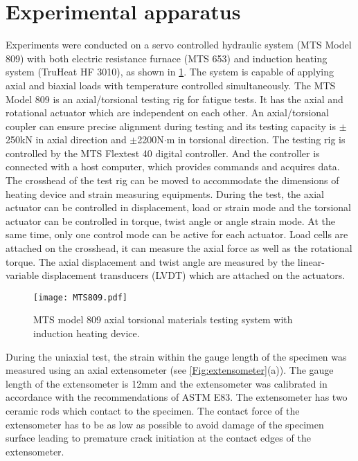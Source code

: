 \section{Experimental apparatus}
\noindent
Experiments were conducted on a servo controlled hydraulic system (MTS Model 809) with both electric resistance furnace (MTS 653) and induction heating system (TruHeat HF 3010), as shown in \ref{Fig:MTS809}.
The system is capable of applying axial and biaxial loads with temperature controlled simultaneously.
The MTS Model 809 is an axial/torsional testing rig for fatigue tests. It has the axial and rotational actuator which are independent on each other.
An axial/torsional coupler can ensure precise alignment during testing and its testing capacity is $\pm$250kN in axial direction and $\pm$2200N$\cdot$m in torsional direction.
The testing rig is controlled by the MTS Flextest 40 digital controller. And the controller is connected with a host computer, which provides commands and acquires data.
The crosshead of the test rig can be moved to accommodate the dimensions of heating device and strain measuring equipments.
During the test, the axial actuator can be controlled in displacement, load or strain mode and the torsional actuator can be controlled in torque, twist angle or angle strain mode.
At the same time, only one control mode can be active for each actuator.
Load cells are attached on the crosshead, it can measure the axial force as well as the rotational torque.
The axial displacement and twist angle are measured by the linear-variable displacement transducers (LVDT) which are attached on the actuators.

\begin{figure}[!htp]
  \centering
  \texttt{[image: MTS809.pdf]}
\caption{MTS model 809 axial torsional materials testing system with induction heating device.}
\label{Fig:MTS809}
\end{figure}

During the uniaxial test, the strain within the gauge length of the specimen was measured using an axial extensometer (see \ref{Fig:extensometer}(a)).
The gauge length of the extensometer is 12mm and the extensometer was calibrated in accordance with the recommendations of ASTM E83.
The extensometer has two ceramic rods which contact to the specimen.
The contact force of the extensometer has to be as low as possible to avoid damage of the specimen surface leading to premature crack initiation at the contact edges of the extensometer.


